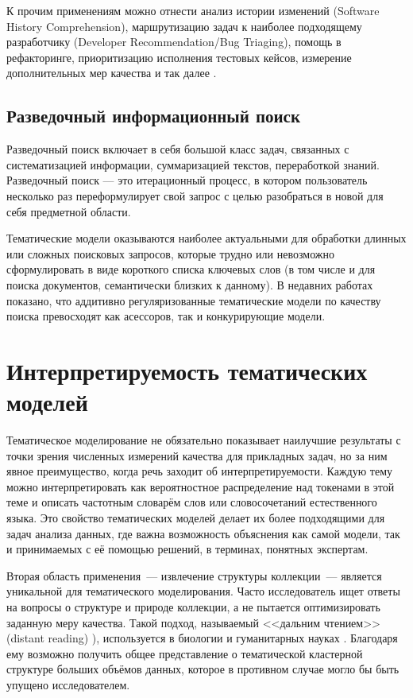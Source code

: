 К прочим применениям можно отнести анализ истории изменений (Software History Comprehension), маршрутизацию задач к наиболее подходящему разработчику (Developer Recommendation/Bug Triaging), помощь в рефакторинге, приоритизацию исполнения тестовых кейсов, измерение дополнительных мер качества и так далее \cite{sun2016exploring,chen2016survey}.

\subsection{Разведочный информационный поиск}

Разведочный поиск включает в себя большой класс задач, связанных с систематизацией информации, суммаризацией текстов, переработкой знаний. Разведочный поиск --- это итерационный процесс, в котором пользователь несколько раз переформулирует свой запрос с целью разобраться в новой для себя предметной области.

Тематические модели оказываются наиболее актуальными для обработки длинных или сложных поисковых запросов, которые трудно  или невозможно сформулировать в виде короткого списка ключевых слов (в том числе и для поиска документов, семантически близких к данному). В недавних работах \cite{yanina17technews, ianina2019regularized} показано, что аддитивно регуляризованные тематические модели по качеству поиска превосходят как асессоров, так и конкурирующие модели.

\section{Интерпретируемость тематических моделей}

Тематическое моделирование не обязательно показывает наилучшие результаты с точки зрения численных измерений качества для прикладных задач, но за ним явное преимущество, когда речь заходит об интерпретируемости. Каждую тему можно интерпретировать как вероятностное распределение над токенами в этой теме и описать частотным словарём слов или словосочетаний естественного языка. Это свойство тематических моделей делает их более подходящими для задач анализа данных, где важна возможность объяснения как самой модели, так и принимаемых с её помощью решений, в терминах, понятных экспертам.

Вторая область применения~--- извлечение структуры коллекции~--- является уникальной для тематического моделирования. Часто исследователь ищет ответы на вопросы о структуре и природе коллекции, а не пытается оптимизировать заданную меру качества. Такой подход, называемый <<дальним чтением>> (distant reading) \cite{milkova2019distant}), используется в  биологии \cite{Liu2016,funnell2019integrated} и гуманитарных науках \cite{fntir2017applications,antons2019content}. Благодаря ему возможно получить общее представление о тематической кластерной структуре больших объёмов данных, которое в противном случае могло бы быть упущено исследователем.


